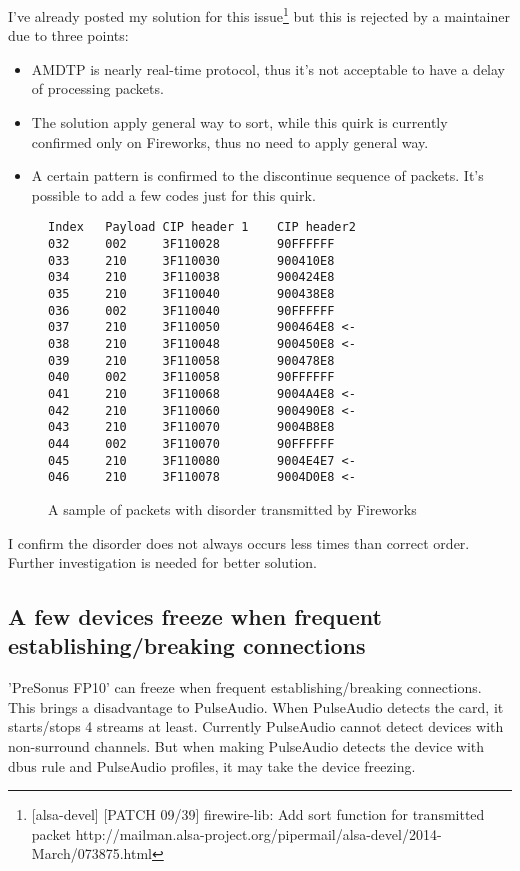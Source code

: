 \documentclass[onecolumn]{article}
\begin{document}
I've already posted my solution for this issue\footnote{[alsa-devel] [PATCH 09/39] firewire-lib: Add sort function for transmitted packet http://mailman.alsa-project.org/pipermail/alsa-devel/2014-March/073875.html} but this is rejected by a maintainer due to three points:
\begin{itemize}
\item AMDTP is nearly real-time protocol, thus it's not acceptable to have a delay of processing packets.
\item The solution apply general way to sort, while this quirk is currently confirmed only on Fireworks, thus no need to apply general way.
\item A certain pattern is confirmed to the discontinue sequence of packets. It's possible to add a few codes just for this quirk.
\end{itemize}

\begin{figure}[htbp]
\small
\begin{verbatim}
Index   Payload CIP header 1    CIP header2
032     002     3F110028        90FFFFFF
033     210     3F110030        900410E8
034     210     3F110038        900424E8
035     210     3F110040        900438E8
036     002     3F110040        90FFFFFF
037     210     3F110050        900464E8 <-
038     210     3F110048        900450E8 <-
039     210     3F110058        900478E8
040     002     3F110058        90FFFFFF
041     210     3F110068        9004A4E8 <-
042     210     3F110060        900490E8 <-
043     210     3F110070        9004B8E8
044     002     3F110070        90FFFFFF
045     210     3F110080        9004E4E7 <-
046     210     3F110078        9004D0E8 <-
\end{verbatim}
\caption{A sample of packets with disorder transmitted by Fireworks}
\label{fireworks-disorder}
\end{figure}

I confirm the disorder does not always occurs less times than correct order. Further investigation is needed for better solution.

\subsection{A few devices freeze when frequent establishing/breaking connections}
'PreSonus FP10' can freeze when frequent establishing/breaking connections. This brings a disadvantage to PulseAudio. When PulseAudio detects the card, it starts/stops 4 streams at least. Currently PulseAudio cannot detect devices with non-surround channels. But when making PulseAudio detects the device with dbus rule and PulseAudio profiles, it may take the device freezing.
\end{document}
